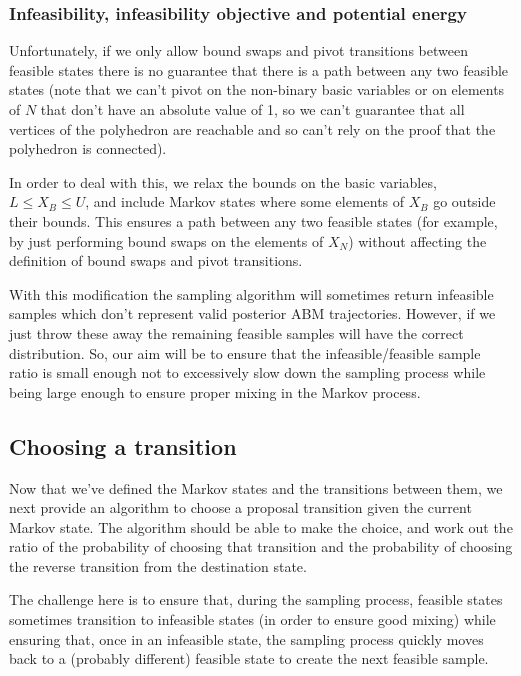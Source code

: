 \documentclass{article}
\begin{document}
\subsubsection{Infeasibility, infeasibility objective and potential energy}

Unfortunately, if we only allow bound swaps and pivot transitions between feasible states there is no guarantee that there is a path between any two feasible states (note that we can't pivot on the non-binary basic variables or on elements of $N$ that don't have an absolute value of 1, so we can't guarantee that all vertices of the polyhedron are reachable and so can't rely on the proof that the polyhedron is connected).

In order to deal with this, we relax the bounds on the basic variables, $L \le X_B \le U$, and include Markov states where some elements of $X_B$ go outside their bounds. This ensures a path between any two feasible states (for example, by just performing bound swaps on the elements of $X_N$) without affecting the definition of bound swaps and pivot transitions.

With this modification the sampling algorithm will sometimes return infeasible samples which don't represent valid posterior ABM trajectories. However, if we just throw these away the remaining feasible samples will have the correct distribution. So, our aim will be to ensure that the infeasible/feasible sample ratio is small enough not to excessively slow down the sampling process while being large enough to ensure proper mixing in the Markov process.

\subsection{Choosing a transition}

Now that we've defined the Markov states and the transitions between them, we next provide an algorithm to choose a proposal transition given the current Markov state. The algorithm should be able to make the choice, and work out the ratio of the probability of choosing that transition and the probability of choosing the reverse transition from the destination state.

The challenge here is to ensure that, during the sampling process, feasible states sometimes transition to infeasible states (in order to ensure good mixing) while ensuring that, once in an infeasible state, the sampling process quickly moves back to a (probably different) feasible state to create the next feasible sample.
\end{document}
